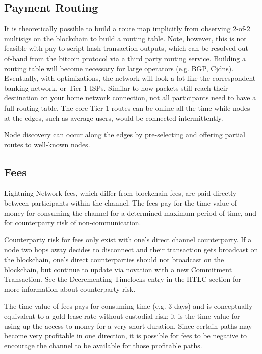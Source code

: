 \documentclass[letterpaper,11pt]{article}
\begin{document}
\subsection{Payment Routing}

It is theoretically possible to build a route map implicitly from observing
2-of-2 multisigs on the blockchain to build a routing table. Note, however, this
is not feasible with pay-to-script-hash transaction outputs, which can be
resolved out-of-band from the bitcoin protocol via a third party routing
service. Building a routing table will become necessary for large operators
(e.g. BGP, Cjdns). Eventually, with optimizations, the network will look a lot
like the correspondent banking network, or Tier-1 ISPs. Similar to how packets
still reach their destination on your home network connection, not all
participants need to have a full routing table. The core Tier-1 routes can be
online all the time \textemdash while nodes at the edges, such as average users,
would be connected intermittently.

Node discovery can occur along the edges by pre-selecting and offering partial
routes to well-known nodes.

\subsection{Fees}

Lightning Network fees, which differ from blockchain fees, are paid directly
between participants within the channel. The fees pay for the time-value of
money for consuming the channel for a determined maximum period of time, and
for counterparty risk of non-communication.

Counterparty risk for fees only exist with one's direct channel counterparty.
If a node two hops away decides to disconnect and their transaction gets
broadcast on the blockchain, one's direct counterparties should not broadcast
on the blockchain, but continue to update via novation with a new Commitment
Transaction. See the Decrementing Timelocks entry in the HTLC section for more
information about counterparty risk.

The time-value of fees pays for consuming time (e.g. 3 days) and is
conceptually equivalent to a gold lease rate without custodial risk; it is the
time-value for using up the access to money for a very short duration. Since
certain paths may become very profitable in one direction, it is possible for
fees to be negative to encourage the channel to be available for those
profitable paths.
\end{document}
